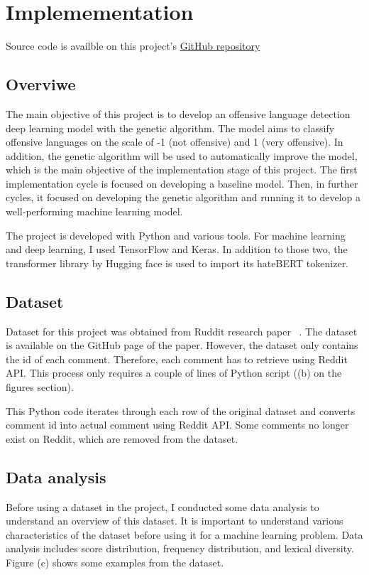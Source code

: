 \documentclass[11pt, natbib=false]{article}
\begin{document}
\section{Implemementation}
Source code is availble on this project's \href{https://github.com/hayacon/cs_final_project}{GitHub repository}
\subsection{Overviwe}
The main objective of this project is to develop an offensive language detection deep learning model with the genetic algorithm.
The model aims to classify offensive languages on the scale of -1 (not offensive) and 1 (very offensive).
In addition, the genetic algorithm will be used to automatically improve the model, which is the main objective of the implementation stage of this project.
The first implementation cycle is focused on developing a baseline model.
Then, in further cycles, it focused on developing the genetic algorithm and running it to develop a well-performing machine learning model.

The project is developed with Python and various tools.
For machine learning and deep learning, I used TensorFlow and Keras.
In addition to those two, the transformer library by Hugging face is used to import its hateBERT tokenizer.

\subsection{Dataset}
Dataset for this project was obtained from Ruddit research paper ~\cite{hada2021ruddit}.
The dataset is available on the GitHub page of the paper.
However, the dataset only contains the id of each comment.
Therefore, each comment has to retrieve using Reddit API.
This process only requires a couple of lines of Python script ((b) on the figures section).

This Python code iterates through each row of the original dataset and converts comment id into actual comment using Reddit API.
Some comments no longer exist on Reddit, which are removed from the dataset.

\subsection{Data analysis}
Before using a dataset in the project, I conducted some data analysis to understand an overview of this dataset.
It is important to understand various characteristics of the dataset before using it for a machine learning problem.
Data analysis includes score distribution, frequency distribution, and lexical diversity.
Figure (c) shows some examples from the dataset.
\end{document}
